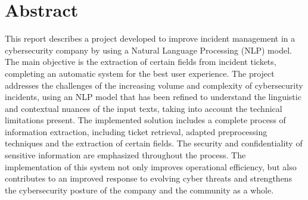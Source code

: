 \chapter*{\centering Abstract}
This report describes a project developed to improve incident management in a cybersecurity company by using a Natural Language Processing (NLP) model. The main objective is the extraction of certain fields from incident tickets, completing an automatic system for the best user experience. The project addresses the challenges of the increasing volume and complexity of cybersecurity incidents, using an NLP model that has been refined to understand the linguistic and contextual nuances of the input texts, taking into account the technical limitations present. The implemented solution includes a complete process of information extraction, including ticket retrieval, adapted preprocessing techniques and the extraction of certain fields. The security and confidentiality of sensitive information are emphasized throughout the process. The implementation of this system not only improves operational efficiency, but also contributes to an improved response to evolving cyber threats and strengthens the cybersecurity posture of the company and the community as a whole.
